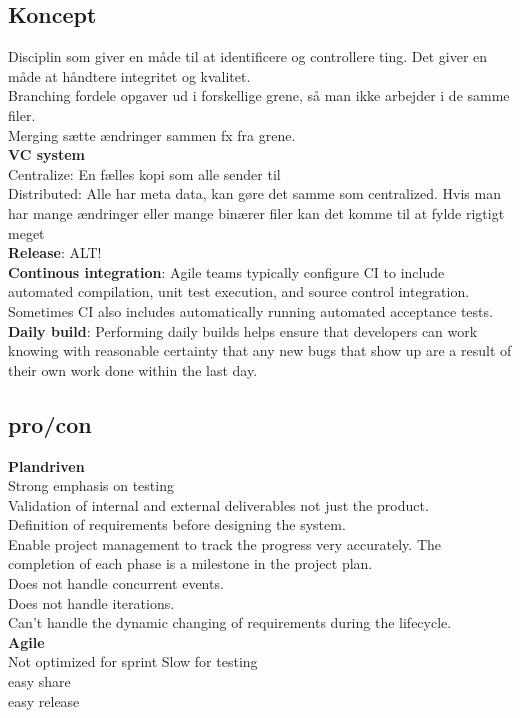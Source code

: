\documentclass[11pt,a4paper]{article}
\begin{document}
\subsection{Koncept}
Disciplin som giver en måde til at identificere og controllere ting. Det giver en måde at håndtere integritet og kvalitet.\\
Branching fordele opgaver ud i forskellige grene, så man ikke arbejder i de samme filer.\\
Merging sætte ændringer sammen fx fra grene.\\
\textbf{VC system}\\
Centralize: En fælles kopi som alle sender til\\
Distributed: Alle har meta data, kan gøre det samme som centralized. Hvis man har mange ændringer eller mange binærer filer kan det komme til at fylde rigtigt meget\\
\textbf{Release}: ALT!\\
\textbf{Continous integration}: Agile teams typically configure CI to include automated compilation, unit test execution, and source control integration. Sometimes CI also includes automatically running automated acceptance tests.\\
\textbf{Daily build}: Performing daily builds helps ensure that developers can work knowing with reasonable certainty that any new bugs that show up are a result of their own work done within the last day.
\subsection{pro/con}
\textbf{Plandriven}\\
Strong emphasis on testing\\
Validation of internal and external deliverables not just the product.\\
Definition of requirements before designing the system.\\
Enable project management to track the progress very accurately. The completion of each phase is a milestone in the project plan.\\
Does not handle concurrent events.\\
Does not handle iterations.\\
Can't handle the dynamic changing of requirements during the lifecycle.\\
\textbf{Agile}\\
Not optimized for sprint
Slow for testing\\
easy share\\
easy release
\end{document}
